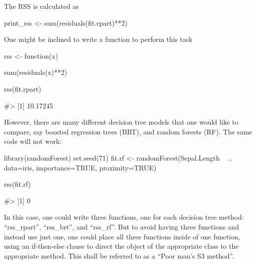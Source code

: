 The RSS is calculated as

\begin{Schunk}
\begin{Sinput}
print_rss <- sum(residuals(fit.rpart)**2)
\end{Sinput}
\end{Schunk}

One might be inclined to write a function to perform this task

\begin{Schunk}
\begin{Sinput}
rss <- function(x){
  
  sum(residuals(x)**2)
  
}

rss(fit.rpart)
\end{Sinput}
\begin{Soutput}
#> [1] 10.17245
\end{Soutput}
\end{Schunk}

However, there are many different decision tree models that one would
like to compare, say boosted regression trees (BRT), and random forests
(RF). The same code will not work:

\begin{Schunk}
\begin{Sinput}
library(randomForest)
set.seed(71)
fit.rf <- randomForest(Sepal.Length ~ ., data=iris, importance=TRUE,
                        proximity=TRUE)

rss(fit.rf)
\end{Sinput}
\begin{Soutput}
#> [1] 0
\end{Soutput}
\end{Schunk}

In this case, one could write three functions, one for each decision
tree method: ``rss\_rpart'', ``rss\_brt'', and ``rss\_rf''. But to avoid
having three functions and instead use just one, one could place all
three functions inside of one function, using an if-then-else clause to
direct the object of the appropriate class to the appropriate method.
This shall be referred to as a ``Poor man's S3 method''.

